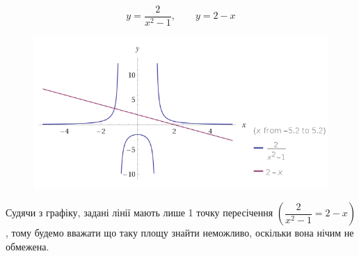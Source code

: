 {}

$$
  y=\dfrac{2}{x^2-1},{\qquad} y = 2-x
$$


\begin{figure}[h!]
  \centering
  \includegraphics[width=14cm]{rozrahunkova_02/04_01.png}
  \label{fig:rr_02_04_01}
  \centering
\end{figure}

Судячи з графіку, задані лінії мають лише 1 точку пересічення $(\dfrac{2}{x^2-1} = 2-x)$, тому будемо вважати що таку площу знайти неможливо, оскільки вона нічим не обмежена.
